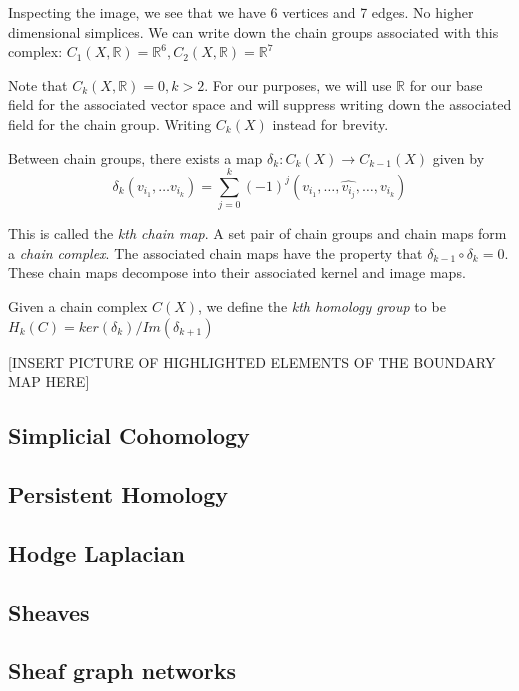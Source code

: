 \documentclass[12pt]{article}
\begin{document}
Inspecting the image, we see that we have 6 vertices and 7 edges. No higher dimensional simplices. 
We can write down the chain groups associated with this complex: $C_1(X, \mathbb{R}) = \mathbb{R}^6 , C_2(X, \mathbb{R}) = \mathbb{R}^7$


Note that $C_k(X, \mathbb{R}) = 0, k > 2$. For our purposes, we will use $\mathbb{R}$ for our base field for the 
associated vector space and will suppress writing down the associated field for the chain group. Writing 
$C_k(X)$ instead for brevity.

Between chain groups, there exists a map $\delta_{k}: C_k(X) \to C_{k-1}(X)$ given by
\begin{equation}
  \delta_k (v_{i_1}, \ldots v_{i_k}) =  \sum_{j = 0}^{k} (-1)^j (v_{i_1}, \ldots, \hat{v_{i_j}} , \ldots, v_{i_k})
\end{equation}

This is called the \textit{kth chain map}. A set pair of chain groups and chain maps form a \textit{chain complex}.
The associated chain maps have the property that $\delta_{k-1} \circ \delta_{k} = 0$. These chain maps decompose 
into their associated kernel and image maps.

Given a chain complex $C(X)$, we define the \textit{kth homology group} to be $H_k(C) = ker(\delta_k) / Im(\delta_{k+1})$

[INSERT PICTURE OF HIGHLIGHTED ELEMENTS OF THE BOUNDARY MAP HERE]



\subsection{Simplicial Cohomology}

\subsection{Persistent Homology}

\subsection{Hodge Laplacian}

\subsection{Sheaves}

\subsection{Sheaf graph networks}
\end{document}
